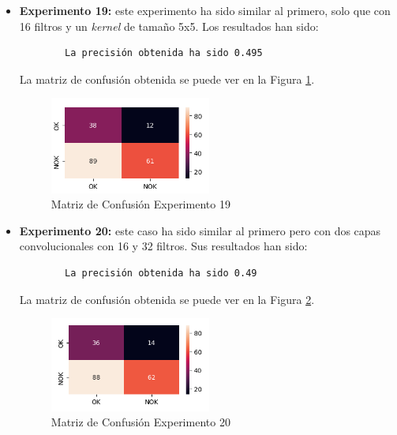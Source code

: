 \begin{itemize}
    \item \textbf{Experimento 19:} este experimento ha sido similar al primero, solo que con 16 filtros y un \emph{kernel} de tamaño 5x5. Los resultados han sido:
    \begin{verbatim}
        La precisión obtenida ha sido 0.495
    \end{verbatim}
    La matriz de confusión obtenida se puede ver en la Figura \ref{f:exp19}.
    \begin{figure}[h]
     \centering
      \includegraphics[width=0.5\textwidth]{img/exp19.PNG}
     \caption{Matriz de Confusión Experimento 19}
     \label{f:exp19}
    \end{figure}
    
    \item \textbf{Experimento 20:} este caso ha sido similar al primero pero con dos capas convolucionales con 16 y 32 filtros. Sus resultados han sido:
    \begin{verbatim}
        La precisión obtenida ha sido 0.49
    \end{verbatim}
    La matriz de confusión obtenida se puede ver en la Figura \ref{f:exp20}.
    \begin{figure}[h]
     \centering
      \includegraphics[width=0.5\textwidth]{img/exp20.PNG}
     \caption{Matriz de Confusión Experimento 20}
     \label{f:exp20}
    \end{figure}
    

\end{itemize}
